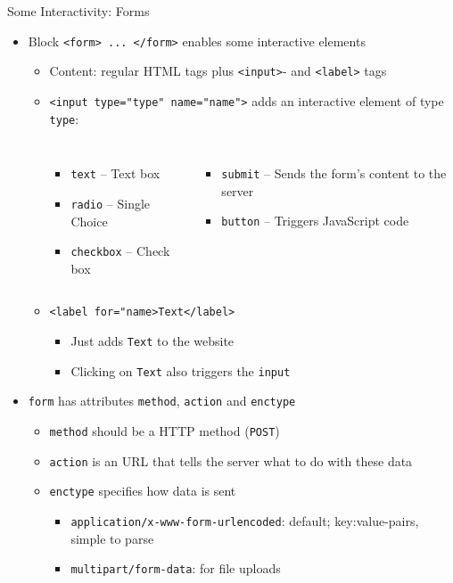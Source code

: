 
\begin{frame}{Some Interactivity: Forms}
%
\begin{itemize}
\item Block \texttt{<form> ... </form>} enables some interactive elements
	\begin{itemize}
	\item Content: regular HTML tags plus \texttt{<input>}- and \texttt{<label>} tags
	\item \texttt{<input type="type" name="name">} adds an interactive element of type \texttt{type}:
		\vspace{-3pt}
		\begin{columns}[T]
			\begin{itemize}
			\item \texttt{text} -- Text box
			\item \texttt{radio} -- Single Choice
			\item \texttt{checkbox} -- Check box
			\end{itemize}
			\begin{itemize}
			\item \texttt{submit} -- Sends the form's content to the server
			\item \texttt{button} -- Triggers JavaScript code
			\end{itemize}
		\end{columns}

	\item \texttt{<label for="name>Text</label>} 
		\begin{itemize}
		\item Just adds \texttt{Text} to the website
		\item Clicking on \texttt{Text} also triggers the \texttt{input}
		\end{itemize}
	\end{itemize}
\pause
\item \texttt{form} has attributes \texttt{method}, \texttt{action} and \texttt{enctype}
	\begin{itemize}
	\item \texttt{method} should be a HTTP method (\zB \texttt{POST})
	\item \texttt{action} is an URL that tells the server what to do with these data
	\item \texttt{enctype} specifies how data is sent
		\begin{itemize}
		\item \texttt{application/x-www-form-urlencoded}: default; key:value-pairs, simple to parse
		\item \texttt{multipart/form-data}: for file uploads
		\end{itemize}
	\end{itemize}
\end{itemize}
%
\end{frame}

